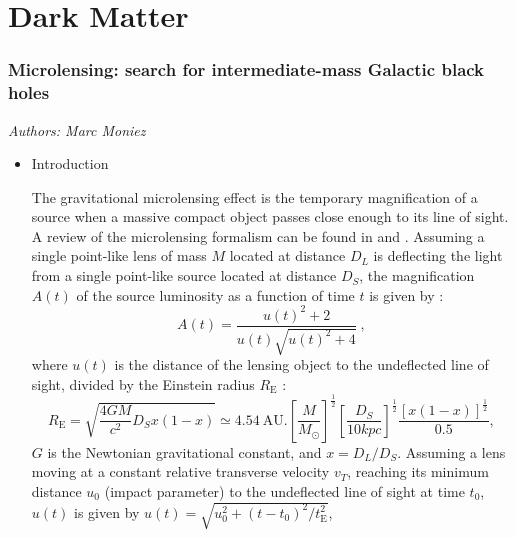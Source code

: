 \section{Dark Matter}
\subsubsection{Microlensing: search for intermediate-mass Galactic black holes}
\emph{Authors: Marc Moniez}
    \begin{itemize}
    \item Introduction
    
    The gravitational microlensing effect is the temporary magnification of a source
when a massive compact object passes close enough to its line of sight.
A review of the microlensing formalism can be found in \cite{j2006} and \cite{Rahvar_2015}.
Assuming a single point-like lens of mass $M$ located at distance $D_L$ is deflecting the
light from a single point-like source located at distance $D_S$, the magnification $A(t)$
of the source luminosity as a function of time $t$ is given by \cite{Paczynski_1986} :
\begin{equation}
\label{magnification}
A(t)=\frac{u(t)^2+2}{u(t)\sqrt{u(t)^2+4}}\ ,
\end{equation}
where $u(t)$ is the distance of the lensing object to the undeflected line of sight, divided by
the Einstein radius $R_{\mathrm{E}}$ :
\begin{equation}
R_{\mathrm{E}}\!\! =\!\! \sqrt{\frac{4GM}{c^2}D_S x(1-x)}
\simeq\! 4.54\ \mathrm{AU}.\left[\frac{M}{M_\odot}\right]^{\frac{1}{2}}\!
\left[\frac{D_S}{10 kpc}\right]^{\frac{1}{2}}\!\!
\frac{\left[x(1-x)\right]^{\frac{1}{2}}}{0.5}, \nonumber
\end{equation}
$G$ is the Newtonian gravitational constant, and $x = D_L/D_S$.
Assuming a lens moving at a constant relative transverse
velocity $v_T$, reaching its minimum
distance $u_0$ (impact parameter) to the undeflected line of sight
at time $t_0$, $u(t)$ is given by $u(t)=\sqrt{u_0^2+(t-t_0)^2/t_{\mathrm{E}}^2}$,

\end{itemize}
